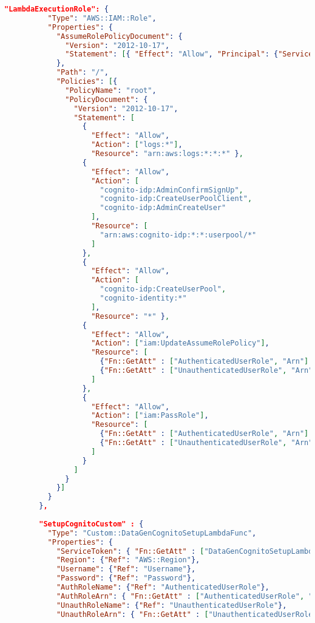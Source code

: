\begin{lstlisting}[language=json,firstnumber=1]
        "LambdaExecutionRole": {
          "Type": "AWS::IAM::Role",
          "Properties": {
            "AssumeRolePolicyDocument": {
              "Version": "2012-10-17",
              "Statement": [{ "Effect": "Allow", "Principal": {"Service": ["lambda.amazonaws.com"]}, "Action": ["sts:AssumeRole"] }]
            },
            "Path": "/",
            "Policies": [{
              "PolicyName": "root",
              "PolicyDocument": {
                "Version": "2012-10-17",
                "Statement": [
                  {
                    "Effect": "Allow",
                    "Action": ["logs:*"],
                    "Resource": "arn:aws:logs:*:*:*" },
                  {
                    "Effect": "Allow",
                    "Action": [
                      "cognito-idp:AdminConfirmSignUp",
                      "cognito-idp:CreateUserPoolClient",
                      "cognito-idp:AdminCreateUser"
                    ],
                    "Resource": [
                      "arn:aws:cognito-idp:*:*:userpool/*"
                    ]
                  },
                  {
                    "Effect": "Allow",
                    "Action": [
                      "cognito-idp:CreateUserPool",
                      "cognito-identity:*"
                    ],
                    "Resource": "*" },
                  {
                    "Effect": "Allow",
                    "Action": ["iam:UpdateAssumeRolePolicy"],
                    "Resource": [
                      {"Fn::GetAtt" : ["AuthenticatedUserRole", "Arn"] },
                      {"Fn::GetAtt" : ["UnauthenticatedUserRole", "Arn"] }
                    ]
                  },
                  {
                    "Effect": "Allow",
                    "Action": ["iam:PassRole"],
                    "Resource": [
                      {"Fn::GetAtt" : ["AuthenticatedUserRole", "Arn"] },
                      {"Fn::GetAtt" : ["UnauthenticatedUserRole", "Arn"] }
                    ]
                  }
                ]
              }
            }]
          }
        },
        
        "SetupCognitoCustom" : {
          "Type": "Custom::DataGenCognitoSetupLambdaFunc",
          "Properties": {
            "ServiceToken": { "Fn::GetAtt" : ["DataGenCognitoSetupLambdaFunc", "Arn"] },
            "Region": {"Ref": "AWS::Region"},
            "Username": {"Ref": "Username"},
            "Password": {"Ref": "Password"},
            "AuthRoleName": {"Ref": "AuthenticatedUserRole"},
            "AuthRoleArn": { "Fn::GetAtt" : ["AuthenticatedUserRole", "Arn"] },
            "UnauthRoleName": {"Ref": "UnauthenticatedUserRole"},
            "UnauthRoleArn": { "Fn::GetAtt" : ["UnauthenticatedUserRole", "Arn"] }
    

\end{lstlisting}
